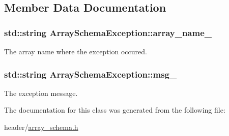 \subsection{Member Data Documentation}
\hypertarget{classArraySchemaException_a1fe09f0a936f026ebc1e1cceac8e116a}{}
\subsubsection[{array\+\_\+name\+\_\+}]{\setlength{\rightskip}{0pt plus 5cm}std\+::string Array\+Schema\+Exception\+::array\+\_\+name\+\_\+\hspace{0.3cm}{\ttfamily [private]}}\label{classArraySchemaException_a1fe09f0a936f026ebc1e1cceac8e116a}
The array name where the exception occured. \hypertarget{classArraySchemaException_a1be9cd8521cef03552f7bd8cb66dbf32}{}
\subsubsection[{msg\+\_\+}]{\setlength{\rightskip}{0pt plus 5cm}std\+::string Array\+Schema\+Exception\+::msg\+\_\+\hspace{0.3cm}{\ttfamily [private]}}\label{classArraySchemaException_a1be9cd8521cef03552f7bd8cb66dbf32}
The exception message. 

The documentation for this class was generated from the following file\+:\begin{DoxyCompactItemize}
\item 
header/\hyperlink{array__schema_8h}{array\+\_\+schema.\+h}\end{DoxyCompactItemize}
